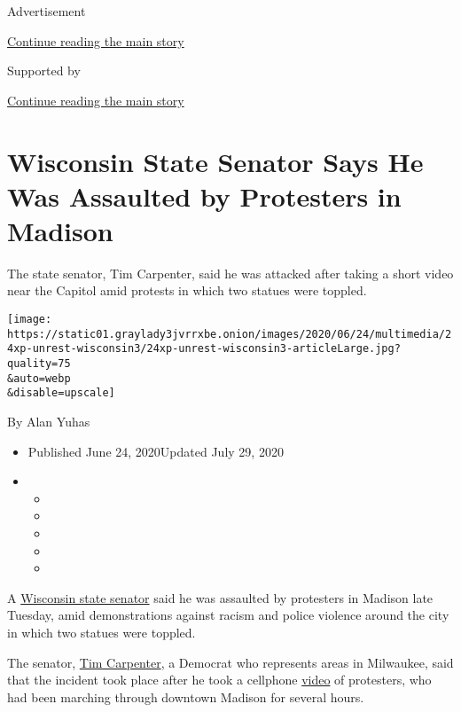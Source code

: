 Advertisement

\protect\hyperlink{after-top}{Continue reading the main story}

Supported by

\protect\hyperlink{after-sponsor}{Continue reading the main story}

\hypertarget{wisconsin-state-senator-says-he-was-assaulted-by-protesters-in-madison}{%
\section{Wisconsin State Senator Says He Was Assaulted by Protesters in
Madison}\label{wisconsin-state-senator-says-he-was-assaulted-by-protesters-in-madison}}

The state senator, Tim Carpenter, said he was attacked after taking a
short video near the Capitol amid protests in which two statues were
toppled.

\texttt{[image: https://static01.graylady3jvrrxbe.onion/images/2020/06/24/multimedia/24xp-unrest-wisconsin3/24xp-unrest-wisconsin3-articleLarge.jpg?quality=75\\\&auto=webp\\\&disable=upscale]}

By Alan Yuhas

\begin{itemize}
\item
  Published June 24, 2020Updated July 29, 2020
\item
  \begin{itemize}
  \item
  \item
  \item
  \item
  \item
  \end{itemize}
\end{itemize}

A
\href{https://www.nytimes3xbfgragh.onion/2020/07/29/us/wisconsin-tim-carpenter-attacked.html}{Wisconsin
state senator} said he was assaulted by protesters in Madison late
Tuesday, amid demonstrations against racism and police violence around
the city in which two statues were toppled.

The senator,
\href{https://www.nytimes3xbfgragh.onion/2020/07/29/us/wisconsin-tim-carpenter-attacked.html}{Tim
Carpenter}, a Democrat who represents areas in Milwaukee, said that the
incident took place after he took a cellphone
\href{https://twitter.com/TimCarpenterMKE/status/1275716467007328258}{video}
of protesters, who had been marching through downtown Madison for
several hours.


